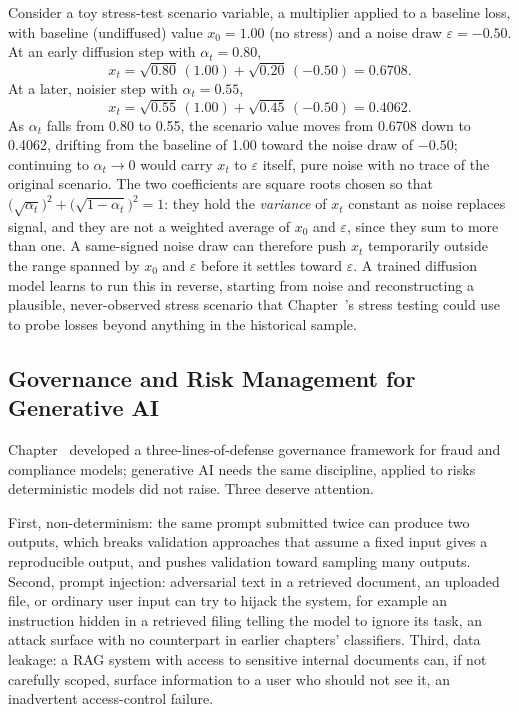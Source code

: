 \documentclass[../ai_in_finance]{subfiles}
\begin{document}
Consider a toy stress-test scenario variable, a multiplier applied to a baseline loss, with baseline (undiffused) value $x_0 = 1.00$ (no stress) and a noise draw $\varepsilon = -0.50$. At an early diffusion step with
$\alpha_t = 0.80$,
$$x_t = \sqrt{0.80}\,(1.00) + \sqrt{0.20}\,(-0.50) = 0.6708.$$
At a later, noisier step with $\alpha_t = 0.55$,
$$x_t = \sqrt{0.55}\,(1.00) + \sqrt{0.45}\,(-0.50) = 0.4062.$$
As $\alpha_t$ falls from 0.80 to 0.55, the scenario value moves from 0.6708 down to 0.4062,
drifting from the baseline of 1.00 toward the noise draw of $-0.50$; continuing to $\alpha_t \to 0$
would carry $x_t$ to $\varepsilon$ itself, pure noise with no trace of the original scenario. The two coefficients are square roots chosen so that $\big(\sqrt{\alpha_t}\big)^2 + \big(\sqrt{1-\alpha_t}\big)^2 = 1$: they hold the \emph{variance} of $x_t$ constant as noise replaces signal, and they are not a weighted average of $x_0$ and $\varepsilon$, since they sum to more than one. A same-signed noise draw can therefore push $x_t$ temporarily outside the range spanned by $x_0$ and $\varepsilon$ before it settles toward $\varepsilon$. A trained diffusion model learns
to run this in reverse, starting from noise and reconstructing a plausible, never-observed stress scenario that
Chapter~'s stress testing could use to probe losses beyond anything in the historical sample.

\subsection{Governance and Risk Management for Generative AI}
\label{sec:genai-governance}

Chapter~ developed a three-lines-of-defense governance framework for fraud and compliance models; generative AI needs the same discipline, applied to risks deterministic models did not raise. Three deserve attention.

First, non-determinism: the same prompt submitted twice can produce two outputs, which breaks validation approaches that assume a fixed input gives a reproducible output, and pushes validation toward sampling many outputs. Second, prompt injection: adversarial text in a retrieved document, an uploaded file, or ordinary user input can try to hijack the system, for example an instruction hidden in a retrieved filing telling the model to ignore its task, an attack surface with no counterpart in earlier chapters' classifiers. Third, data leakage: a RAG system with access to sensitive internal documents can, if not carefully scoped, surface information to a user who should not see it, an inadvertent access-control failure.
\end{document}
